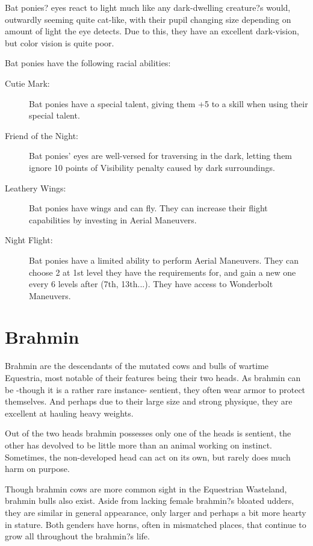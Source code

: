 \documentclass[11pt,a4paper,twocolumn]{book}
\begin{document}
	Bat ponies? eyes react to light much like any dark-dwelling creature?s would, outwardly seeming quite cat-like, with their pupil changing size depending on amount of light the eye detects. Due to this, they have an excellent dark-vision, but color vision is quite poor.
	
	Bat ponies have the following racial abilities:
	\begin{description}
		\item[Cutie Mark:] Bat ponies have a special talent, giving them +5 to a skill when using their special talent.
		\item[Friend of the Night:] Bat ponies' eyes are well-versed for traversing in the dark, letting them ignore 10 points of Visibility penalty caused by dark surroundings.
		\item[Leathery Wings:] Bat ponies have wings and can fly. They can increase their flight capabilities by investing in Aerial Maneuvers.
		\item[Night Flight:] Bat ponies have a limited ability to perform Aerial Maneuvers. They can choose 2 at 1st level they have the requirements for, and gain a new one every 6 levels after (7th, 13th...). They have access to Wonderbolt Maneuvers.
	\end{description}

	\clearpage
	
	\section*{Brahmin}
	
	Brahmin are the descendants of the mutated cows and bulls of wartime Equestria, most notable of their features being their two heads. As brahmin can be -though it is a rather rare instance- sentient, they often wear armor to protect themselves. And perhaps due to their large size and strong physique, they are excellent at hauling heavy weights.
	
	Out of the two heads brahmin possesses only one of the heads is sentient, the other has devolved to be little more than an animal working on instinct. Sometimes, the non-developed head can act on its own, but rarely does much harm on purpose.
	
	Though brahmin cows are more common sight in the Equestrian Wasteland, brahmin bulls also exist. Aside from lacking female brahmin?s bloated udders, they are similar in general appearance, only larger and perhaps a bit more hearty in stature. Both genders have horns, often in mismatched places, that continue to grow all throughout the brahmin?s life.
	
\end{document}
